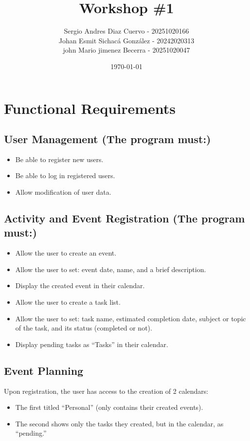 \documentclass[man]{apa7}
\title{Workshop \#1}
\author{Sergio Andres Diaz Cuervo - 20251020166  \\ Johan Esmit Sichacá González - 20242020313 \\ john Mario jimenez Becerra - 20251020047}
\affiliation{Professor: Carlos Andres Sierra Virguez \\[0.5cm] Subject: OOP}
\date{\today}
\begin{document}
\maketitle

\section{Functional Requirements}

\subsection{User Management (The program must:)}
\begin{itemize}
    \item Be able to register new users.
    \item Be able to log in registered users.
    \item Allow modification of user data.
\end{itemize}

\subsection{Activity and Event Registration (The program must:)}
\begin{itemize}
    \item Allow the user to create an event.
    \item Allow the user to set: event date, name, and a brief description.
    \item Display the created event in their calendar.
    \item Allow the user to create a task list.
    \item Allow the user to set: task name, estimated completion date, subject or topic of the task, and its status (completed or not).
    \item Display pending tasks as “Tasks” in their calendar.
\end{itemize}

\subsection{Event Planning}
Upon registration, the user has access to the creation of 2 calendars:
\begin{itemize}
    \item The first titled “Personal” (only contains their created events).
    \item The second shows only the tasks they created, but in the calendar, as “pending.”
\end{itemize}
\end{document}
